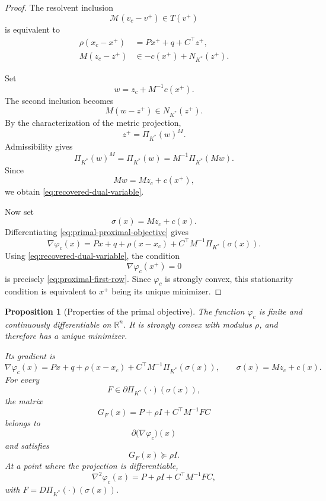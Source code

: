 \documentclass[a4paper,11pt]{book}
\theoremstyle{plain}
\newtheorem{proposition}[theorem]{Proposition}
\theoremstyle{definition}
\theoremstyle{remark}
\numberwithin{equation}{chapter}
\numberwithin{algorithm}{chapter}
\newcommand{\R}{\mathbb{R}}
\newcommand{\proj}[2]{\Pi_{#2}\!\left(#1\right)}
\begin{document}
	\begin{proof}
		The resolvent inclusion
		\[
		\mathcal M(v_c-v^+)\in T(v^+)
		\]
		is equivalent to
		\begin{align}
			\rho(x_c-x^+)
			&=
			Px^++q+C^\top z^+,
			\label{eq:proximal-first-row}\\
			M(z_c-z^+)
			&\in
			-c(x^+)+N_{K^*}(z^+).
			\label{eq:proximal-second-row}
		\end{align}
		
		Set
		\[
		w=z_c+M^{-1}c(x^+).
		\]
		The second inclusion becomes
		\[
		M(w-z^+)\in N_{K^*}(z^+).
		\]
		By the characterization of the metric projection,
		\[
		z^+
		=
		\proj{w}{K^*}^{M}.
		\]
		Admissibility gives
		\[
		\proj{w}{K^*}^{M}
		=
		\proj{w}{K^*}
		=
		M^{-1}\proj{Mw}{K^*}.
		\]
		Since
		\[
		Mw=Mz_c+c(x^+),
		\]
		we obtain \eqref{eq:recovered-dual-variable}.
		
		Now set
		\[
		\sigma(x)=Mz_c+c(x).
		\]
		Differentiating \eqref{eq:primal-proximal-objective} gives
		\[
		\nabla\varphi_c(x)
		=
		Px+q
		+
		\rho(x-x_c)
		+
		C^\top M^{-1}\proj{\sigma(x)}{K^*}.
		\]
		Using \eqref{eq:recovered-dual-variable}, the condition
		\[
		\nabla\varphi_c(x^+)=0
		\]
		is precisely \eqref{eq:proximal-first-row}. Since \(\varphi_c\) is strongly
		convex, this stationarity condition is equivalent to \(x^+\) being its
		unique minimizer.
	\end{proof}
	
	\begin{proposition}[Properties of the primal objective]
		The function \(\varphi_c\) is finite and continuously differentiable on
		\(\R^n\). It is strongly convex with modulus \(\rho\), and therefore has a
		unique minimizer.
		
		Its gradient is
		\begin{equation}
			\nabla\varphi_c(x)
			=
			Px+q
			+
			\rho(x-x_c)
			+
			C^\top M^{-1}\proj{\sigma(x)}{K^*},
			\qquad
			\sigma(x)=Mz_c+c(x).
			\label{eq:primal-objective-gradient}
		\end{equation}
		For every
		\[
		F\in\partial\proj{\cdot}{K^*}(\sigma(x)),
		\]
		the matrix
		\begin{equation}
			G_F(x)
			=
			P+\rho I+C^\top M^{-1}FC
			\label{eq:primal-generalized-hessian}
		\end{equation}
		belongs to
		\[
		\partial\bigl(\nabla\varphi_c\bigr)(x)
		\]
		and satisfies
		\begin{equation}
			G_F(x)\succeq\rho I.
		\end{equation}
		At a point where the projection is differentiable,
		\[
		\nabla^2\varphi_c(x)
		=
		P+\rho I+C^\top M^{-1}FC,
		\]
		with \(F=D\proj{\cdot}{K^*}(\sigma(x))\).
	\end{proposition}
	
\end{document}
